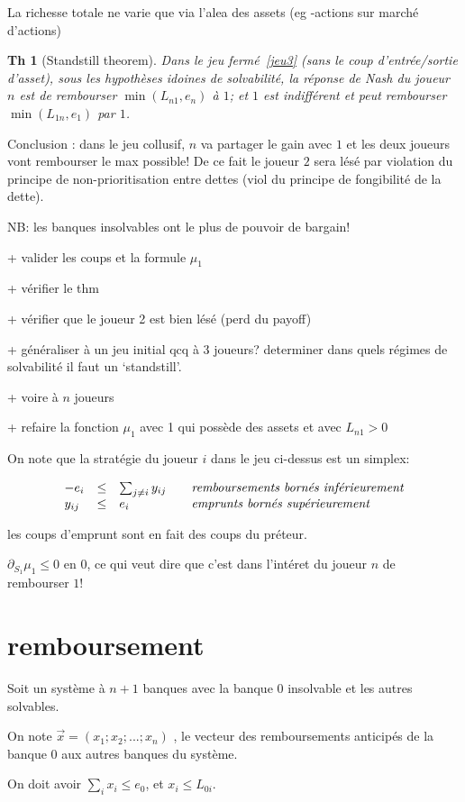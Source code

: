 \documentclass{article}
\newtheorem{theorem}{Th}
\def\AR#1{
\[
\begin{array}{llllllll}
#1
\end{array}
\]
}
\begin{document}
La richesse totale ne varie que via l'alea des assets (eg -actions sur marché d'actions)

\begin{theorem}[Standstill theorem]
Dans le jeu fermé~\ref{jeu3} (sans le coup d'entrée/sortie d'asset),
sous les hypothèses idoines de solvabilité, 
la réponse de Nash du joueur $n$ est de
rembourser $\min(L_{n1},e_n)$ à $1$;
et $1$ est indifférent et peut rembourser $\min(L_{1n},e_1)$ par $1$.
\end{theorem}

Conclusion : dans le jeu collusif,
$n$ va partager le gain avec $1$ et les deux joueurs vont rembourser le max possible! De ce fait le joueur $2$ sera lésé 
par violation du principe de non-prioritisation entre dettes
(viol du principe de fongibilité de la dette).

NB: les banques insolvables ont le plus de pouvoir de bargain!

+ valider les coups et la formule $\mu_1$

+ vérifier le thm

+ vérifier que le joueur 2 est bien lésé (perd du payoff)

+ généraliser à un jeu initial qcq à 3 joueurs? determiner dans quels régimes de solvabilité il faut un `standstill'.

+ voire à $n$ joueurs

+ refaire la fonction $\mu_1$ avec 1 qui possède des assets et avec $L_{n1} >0$

On note que la stratégie du joueur $i$ dans le jeu ci-dessus est un simplex:
\AR{
- e_i &\leq& 
\sum_{j\neq i} y_{ij} 
&&\emph{remboursements bornés inférieurement}
\\
y_{ij} &\leq& 
e_i
&&\emph{emprunts bornés supérieurement}
}
les coups d'emprunt sont en fait des coups du préteur.

$\partial_{S_1}\mu_1\leq 0$ en $0$,
ce qui veut dire que c'est dans l'intéret du joueur $n$ de rembourser $1$!


\section{remboursement}
Soit un système à $n+1$ banques avec la banque $0$ insolvable et les autres solvables. 

On note 
$ \vec{x} = (x_1 ; x_2; ... ; x_n)$ , le vecteur des remboursements anticipés de la banque 0 aux autres banques du système. 

On doit avoir $\sum_i x_i \leq e_0$, 
et $x_i\leq L_{0i}$.
\end{document}
